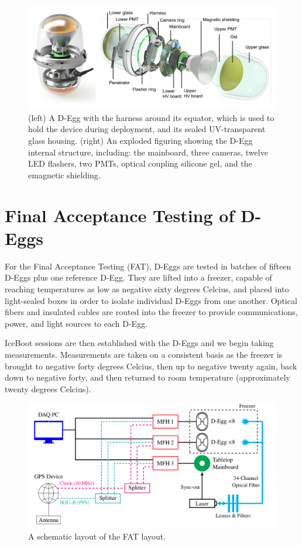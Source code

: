 \documentclass[main.tex]{subfiles}
\begin{document}
\begin{figure}
    \centering
    \includegraphics[width=\linewidth]{figures/degg.png}
    \caption{(left) A D-Egg with the harness around its equator, which is used to hold the device during deployment, and its sealed UV-transparent glass housing. (right) An exploded figuring showing the D-Egg internal structure, including: the mainboard, three cameras, twelve LED flashers, two PMTs, optical coupling silicone gel, and the emagnetic shielding.}\label{fig:degg}
\end{figure}

\section{Final Acceptance Testing of D-Eggs}

For the Final Acceptance Testing (FAT), D-Eggs are tested in batches of fifteen D-Eggs plus one reference D-Egg. 
They are lifted into a freezer, capable of reaching temperatures as low as negative sixty degrees Celcius, and placed into light-sealed boxes in order to isolate individual D-Eggs from one another. 
Optical fibers and insulated cables are routed into the freezer to provide communications, power, and light sources to each D-Egg. 

IceBoot sessions are then established with the D-Eggs and we begin taking measurements. 
Measurements are taken on a consistent basis as the freezer is brought to negative forty degrees Celcius, then up to negative twenty again, back down to negative forty, and then returned to room temperature (approximately twenty degrees Celcius). 

\begin{figure}
    \centering
    \includegraphics[width=\linewidth]{figures/fat_layout.png}
    \caption{A schematic layout of the FAT layout. }
    \label{fig:fatscheme}
\end{figure}
\end{document}
